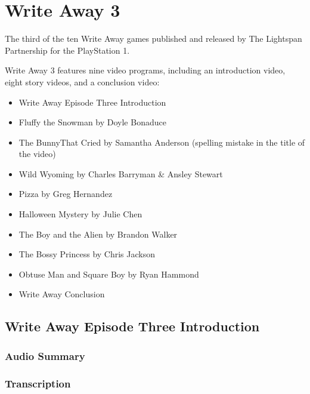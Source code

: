 \chapter{Write Away 3}


The third of the ten Write Away games published and released by The Lightspan Partnership for the PlayStation 1.

Write Away 3 features nine video programs, including an introduction video, eight story videos, and a conclusion video:

\begin{itemize}
    \item Write Away Episode Three Introduction
    \item Fluffy the Snowman by Doyle Bonaduce
    \item The BunnyThat Cried by Samantha Anderson (spelling mistake in the title of the video)
    \item Wild Wyoming by Charles Barryman \& Ansley Stewart
    \item Pizza by Greg Hernandez
    \item Halloween Mystery by Julie Chen
    \item The Boy and the Alien by Brandon Walker
    \item The Bossy Princess by Chris Jackson
    \item Obtuse Man and Square Boy by Ryan Hammond
    \item Write Away Conclusion
\end{itemize}

\clearpage
\newpage

\section{Write Away Episode Three Introduction}

\subsection{Audio Summary}

\subsection{Transcription}

